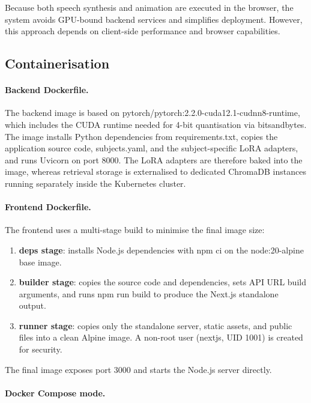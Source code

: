 Because both speech synthesis and animation are executed in the browser, the system avoids GPU-bound backend services and simplifies deployment. However, this approach depends on client-side performance and browser capabilities.

\subsection{Containerisation}

\paragraph{Backend Dockerfile.}
The backend image is based on pytorch/pytorch:2.2.0-cuda12.1-cudnn8-runtime, which includes the CUDA runtime needed for 4-bit quantisation via bitsandbytes. The image installs Python dependencies from requirements.txt, copies the application source code, subjects.yaml, and the subject-specific LoRA adapters, and runs Uvicorn on port 8000. The LoRA adapters are therefore baked into the image, whereas retrieval storage is externalised to dedicated ChromaDB instances running separately inside the Kubernetes cluster.

\paragraph{Frontend Dockerfile.}
The frontend uses a multi-stage build to minimise the final image size:

\begin{enumerate}
    \item \textbf{deps stage}: installs Node.js dependencies with npm ci on the node:20-alpine base image.
    \item \textbf{builder stage}: copies the source code and dependencies, sets API URL build arguments, and runs npm run build to produce the Next.js standalone output.
    \item \textbf{runner stage}: copies only the standalone server, static assets, and public files into a clean Alpine image. A non-root user (nextjs, UID 1001) is created for security.
\end{enumerate}

The final image exposes port 3000 and starts the Node.js server directly.

\paragraph{Docker Compose mode.}

